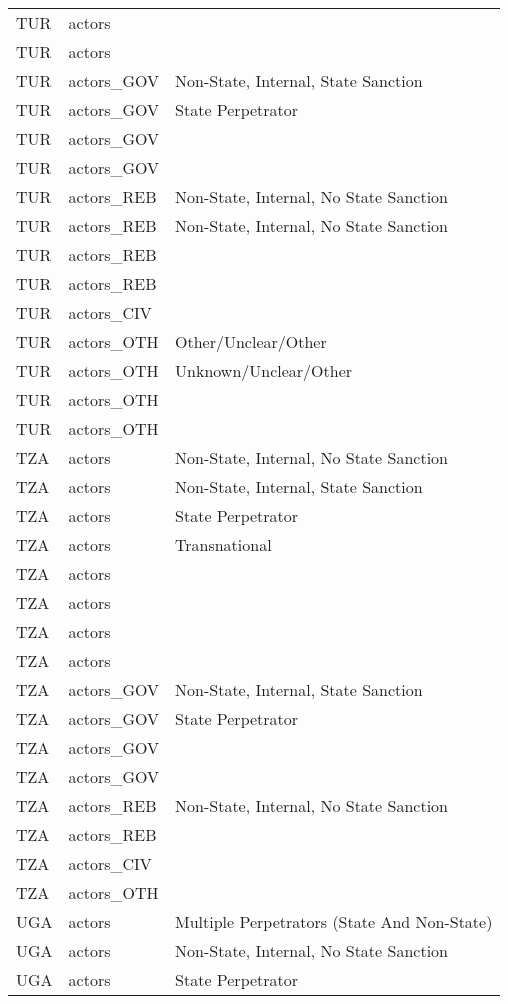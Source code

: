 \begin{table}[ht]
\begin{tabular}{lll}
  TUR & actors &  \\ 
  TUR & actors &  \\ 
  TUR & actors\_GOV & Non-State, Internal, State Sanction \\ 
  TUR & actors\_GOV & State Perpetrator \\ 
  TUR & actors\_GOV &  \\ 
  TUR & actors\_GOV &  \\ 
  TUR & actors\_REB & Non-State, Internal, No State Sanction \\ 
  TUR & actors\_REB & Non-State, Internal, No State Sanction \\ 
  TUR & actors\_REB &  \\ 
  TUR & actors\_REB &  \\ 
  TUR & actors\_CIV &  \\ 
  TUR & actors\_OTH & Other/Unclear/Other \\ 
  TUR & actors\_OTH & Unknown/Unclear/Other \\ 
  TUR & actors\_OTH &  \\ 
  TUR & actors\_OTH &  \\ 
  TZA & actors & Non-State, Internal, No State Sanction \\ 
  TZA & actors & Non-State, Internal, State Sanction \\ 
  TZA & actors & State Perpetrator \\ 
  TZA & actors & Transnational \\ 
  TZA & actors &  \\ 
  TZA & actors &  \\ 
  TZA & actors &  \\ 
  TZA & actors &  \\ 
  TZA & actors\_GOV & Non-State, Internal, State Sanction \\ 
  TZA & actors\_GOV & State Perpetrator \\ 
  TZA & actors\_GOV &  \\ 
  TZA & actors\_GOV &  \\ 
  TZA & actors\_REB & Non-State, Internal, No State Sanction \\ 
  TZA & actors\_REB &  \\ 
  TZA & actors\_CIV &  \\ 
  TZA & actors\_OTH &  \\ 
  UGA & actors & Multiple Perpetrators (State And Non-State) \\ 
  UGA & actors & Non-State, Internal, No State Sanction \\ 
  UGA & actors & State Perpetrator \\ 

\end{tabular}
\end{table}
